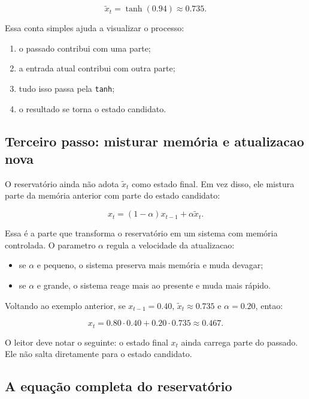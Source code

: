 \documentclass[12pt]{article}
\providecommand{\tightlist}{%
              \setlength{\itemsep}{0pt}\setlength{\parskip}{0pt}}
\begin{document}
\[
\widetilde{x}_t = \tanh(0.94) \approx 0.735.
\]

Essa conta simples ajuda a visualizar o processo:

\begin{enumerate}
\def\labelenumi{\arabic{enumi}.}
\tightlist
\item
  o passado contribui com uma parte;
\item
  a entrada atual contribui com outra parte;
\item
  tudo isso passa pela \texttt{tanh};
\item
  o resultado se torna o estado candidato.
\end{enumerate}

\subsection{Terceiro passo: misturar memória e atualizacao nova}\label{36-terceiro-passo-misturar-memuxf3ria-e-atualizacao-nova}

O reservatório ainda não adota \(\widetilde{x}_t\) como estado final. Em vez disso, ele mistura parte da memória anterior com parte do estado candidato:

\[
x_t = (1 - \alpha) x_{t-1} + \alpha \widetilde{x}_t.
\]

Essa é a parte que transforma o reservatório em um sistema com memória controlada. O parametro \(\alpha\) regula a velocidade da atualizacao:

\begin{itemize}
\tightlist
\item
  se \(\alpha\) e pequeno, o sistema preserva mais memória e muda devagar;
\item
  se \(\alpha\) e grande, o sistema reage mais ao presente e muda mais rápido.
\end{itemize}

Voltando ao exemplo anterior, se \(x_{t-1} = 0.40\), \(\widetilde{x}_t \approx 0.735\) e \(\alpha = 0.20\), entao:

\[
x_t = 0.80 \cdot 0.40 + 0.20 \cdot 0.735 \approx 0.467.
\]

O leitor deve notar o seguinte: o estado final \(x_t\) ainda carrega parte do passado. Ele não salta diretamente para o estado candidato.

\subsection{A equação completa do reservatório}\label{37-a-equauxe7uxe3o-completa-do-reservatuxf3rio}
\end{document}
